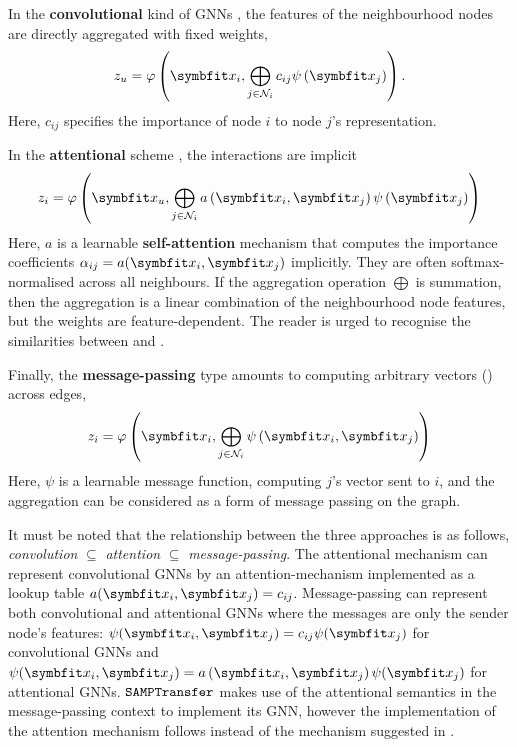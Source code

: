 In the \textbf{convolutional} kind of GNNs \parencite{kipf2016semi}, the features of the neighbourhood nodes are directly aggregated with fixed weights,
\begin{equation}
    z_{u}=\varphi\left(\bfitx_{i}, \bigoplus_{j \in \mathcal{N}_{i}} c_{i j} \psi\left(\bfitx_{j}\right)\right).
    \label{eqn:gcn}
\end{equation}
Here, $c_{ij}$ specifies the importance of node $i$ to node $j$'s representation.

In the \textbf{attentional} scheme \parencite{velic018graph, brody2021attentive}, the interactions are implicit
\begin{equation}
z_{i}=\varphi\left(\bfitx_{u}, \bigoplus_{j \in \mathcal{N}_{i}} a\left(\bfitx_{i}, \bfitx_{j}\right) \psi\left(\bfitx_{j}\right)\right)
\label{eqn:attn-gnn}
\end{equation}
Here, $a$ is a learnable \textbf{self-attention} mechanism that computes the importance coefficients $\alpha_{ij} = a(\bfitx_i,\bfitx_j)$ implicitly. They are often softmax-normalised across all neighbours. If the aggregation operation $\bigoplus$ is summation, then the aggregation is a linear combination of the neighbourhood node features, but the weights are feature-dependent. The reader is urged to recognise the similarities between  and .

Finally, the \textbf{message-passing} type amounts to computing arbitrary vectors () across edges,
\begin{equation}
    z_{i}=\varphi\left(\bfitx_{i}, \bigoplus_{j \in \mathcal{N}_{i}} \psi\left(\bfitx_{i}, \bfitx_{j}\right)\right)
    \label{eqn:mesg-passing}
\end{equation}
Here, $\psi$ is a learnable message function, computing $j$'s vector sent to $i$, and the aggregation can be considered as a form of message passing on the graph.

It must be noted that the relationship between the three approaches is as follows, \textit{convolution} $\subseteq$ \textit{attention} $\subseteq$ \textit{message-passing}. The attentional mechanism can represent convolutional GNNs by an attention-mechanism implemented as a lookup table $a(\bfitx_i, \bfitx_j) = c_{ij}$. Message-passing can represent both convolutional and attentional GNNs where the messages are only the sender node's features: $\psi(\bfitx_i, \bfitx_j)=c_{ij}\psi(\bfitx_j)$ for convolutional GNNs and $\psi(\bfitx_i, \bfitx_j)=a\left(\bfitx_{i}, \bfitx_{j}\right)\psi(\bfitx_j)$ for attentional GNNs. $\texttt{SAMPTransfer}$ makes use of the attentional semantics in the message-passing context to implement its GNN, however the implementation of the attention mechanism follows \parencite{vaswani2017attention} instead of the mechanism suggested in \parencite{velic018graph}.

